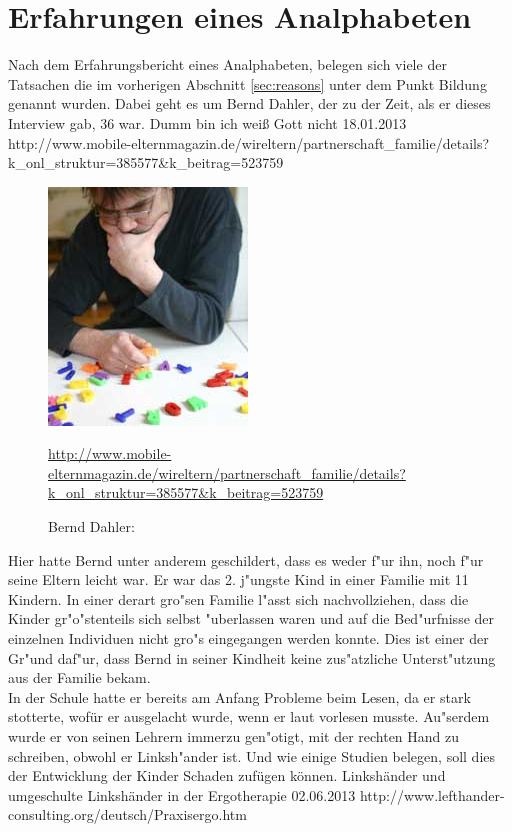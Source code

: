 \section{Erfahrungen eines Analphabeten}


Nach dem Erfahrungsbericht eines Analphabeten, belegen sich viele der Tatsachen die im vorherigen Abschnitt \ref{sec:reasons} unter dem Punkt Bildung genannt wurden. Dabei geht es um Bernd Dahler, der zu der Zeit, als er dieses Interview gab, 36 war.
				{Dumm bin ich weiß Gott nicht}
				{18.01.2013}
				{http://www.mobile-elternmagazin.de/wireltern/partnerschaft_familie/details?k_onl_struktur=385577&k_beitrag=523759}\\


\begin{figure}[h]
	\centering
		\includegraphics[scale=0.80]{Daten/BerndDahler.jpg}
	\caption{Bernd Dahler:} 
	\url{http://www.mobile-elternmagazin.de/wireltern/partnerschaft_familie/details?k_onl_struktur=385577&k_beitrag=523759}
	\label{fig:BerndDahler}
\end{figure}

Hier hatte Bernd unter anderem geschildert, dass es weder f"ur ihn, noch f"ur seine Eltern leicht war. Er war das 2. j"ungste Kind in einer Familie mit 11 Kindern. In einer derart gro"sen Familie l"asst sich nachvollziehen, dass die Kinder gr"o"stenteils sich selbst "uberlassen waren und auf die Bed"urfnisse der einzelnen Individuen nicht gro"s eingegangen werden konnte. Dies ist einer der Gr"und daf"ur, dass Bernd in seiner Kindheit keine zus"atzliche Unterst"utzung aus der Familie bekam.\\

In der Schule hatte er bereits am Anfang Probleme beim Lesen, da er stark stotterte, wofür er ausgelacht wurde, wenn er laut vorlesen musste. Au"serdem wurde er von seinen Lehrern immerzu gen"otigt, mit der rechten Hand zu schreiben, obwohl er Linksh"ander ist. Und wie einige Studien belegen, soll dies der Entwicklung der Kinder Schaden zufügen können.
				{Linkshänder und umgeschulte Linkshänder in der Ergotherapie }
				{02.06.2013}
				{http://www.lefthander-consulting.org/deutsch/Praxisergo.htm}\

